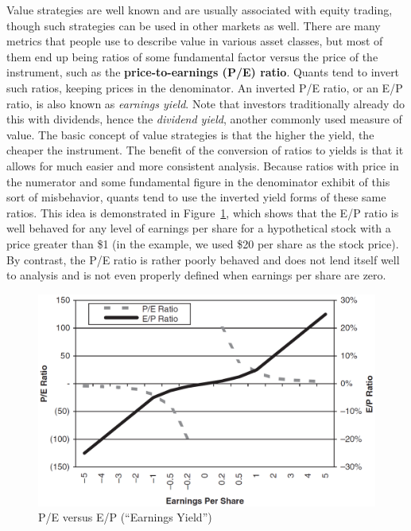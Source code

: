 \documentclass[11pt]{report}
\begin{document}
					Value strategies are well known and are usually associated with equity trading, though such strategies can be used in other markets as well. There are many metrics that people use to describe value in various asset classes, but most of them end up being ratios of some fundamental factor versus the price of the instrument, such as the \textbf{price-to-earnings (P/E) ratio}. Quants tend to invert such ratios, keeping prices in the denominator. An inverted P/E ratio, or an E/P ratio, is also known as \textit{earnings yield}. Note that investors traditionally already do this with dividends, hence the \textit{dividend yield}, another commonly used measure of value. The basic concept of value strategies is that the higher the yield, the cheaper the instrument. The benefit of the conversion of ratios to yields is that it allows for much easier and more consistent analysis. Because ratios with price in the numerator and some fundamental figure in the denominator exhibit of this sort of misbehavior, quants tend to use the inverted yield forms of these same ratios. This idea is demonstrated in Figure~\ref{fig:PEratio}, which shows that the E/P ratio is well behaved for any level of earnings per share for a hypothetical stock with a price greater than \$1 (in the example, we used \$20 per share as the stock price). By contrast, the P/E ratio is rather poorly behaved and does not lend itself well to analysis and is not even properly defined when earnings per share are zero.

					\begin{figure}[htbp]
						\centering
						\includegraphics[width=.9\textwidth]{PEratio.png}
						\caption{P/E versus E/P (``Earnings Yield'')}
						\label{fig:PEratio}
					\end{figure}
\end{document}
